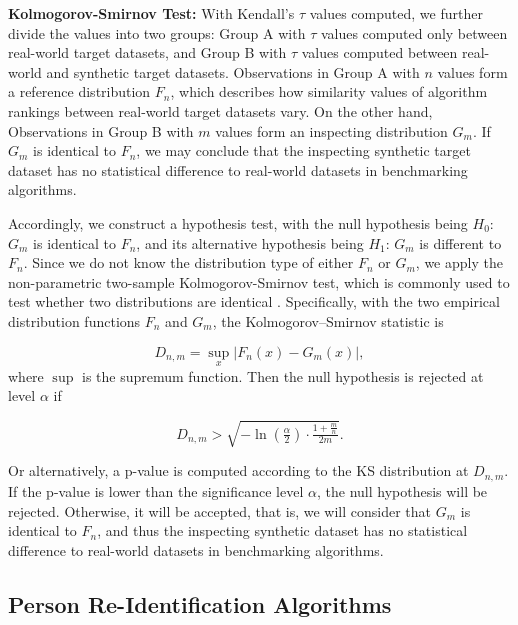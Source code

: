 \documentclass[10pt,twocolumn,letterpaper]{article}
\begin{document}
\textbf{Kolmogorov-Smirnov Test:} With Kendall's $\tau$ values computed, we further divide the values into two groups: Group A with $\tau$ values computed only between real-world target datasets, and Group B with $\tau$ values computed between real-world and synthetic target datasets. Observations in Group A with $n$ values form a reference distribution $F_n$, which describes how similarity values of algorithm rankings between real-world target datasets vary. On the other hand, Observations in Group B with $m$ values form an inspecting distribution $G_m$. If $G_m$ is identical to $F_n$, we may conclude that the inspecting synthetic target dataset has no statistical difference to real-world datasets in benchmarking algorithms.

Accordingly, we construct a hypothesis test, with the null hypothesis being $H_0$: $G_m$ is identical to $F_n$, and its alternative hypothesis being $H_1$: $G_m$ is different to $F_n$. Since we do not know the distribution type of either $F_n$ or $G_m$, we apply the non-parametric two-sample Kolmogorov-Smirnov test, which is commonly used to test whether two distributions are identical \cite{NAAMAN2021109088}. Specifically, with the two empirical distribution functions $F_n$ and $G_m$, the Kolmogorov–Smirnov statistic is

\begin{equation}
    D_{n, m} = \sup _{x}|F_n(x) - G_m(x)|,
\end{equation}
where $\sup$ is the supremum function. Then the null hypothesis is rejected at level $\alpha$ if

\begin{equation} \label{eq:D-thr}
    D_{n,m} > {\sqrt {-\ln \left({\tfrac {\alpha }{2}}\right)\cdot {\tfrac {1+{\tfrac {m}{n}}}{2m}}}}.
\end{equation}

Or alternatively, a p-value is computed according to the KS distribution at $D_{n,m}$. If the p-value is lower than the significance level $\alpha$, the null hypothesis will be rejected. Otherwise, it will be accepted, that is, we will consider that $G_m$ is identical to $F_n$, and thus the inspecting synthetic dataset has no statistical difference to real-world datasets in benchmarking algorithms.

\subsection{Person Re-Identification Algorithms}\label{sec:algo}
\end{document}
